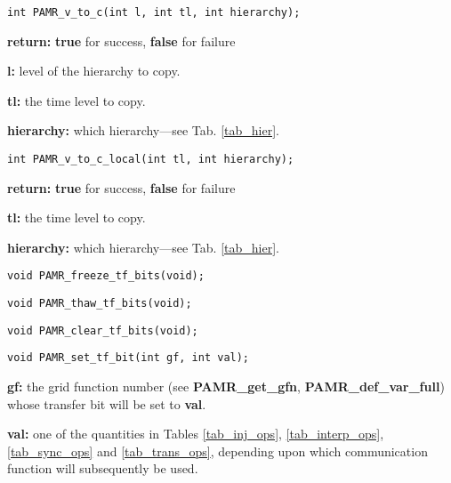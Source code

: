 \documentclass[aps,amssymb,unsortedaddress,nofootinbib]{revtex4}
\def\lsep{\itemsep 0.05in}
\begin{document}
\begin{verbatim}
int PAMR_v_to_c(int l, int tl, int hierarchy);
\end{verbatim}
\begin{list}{}{\lsep}
\item {\bf return:} {\bf true} for success, {\bf false} for failure
\item {\bf l:} level of the hierarchy to copy.
\item {\bf tl:} the time level to copy.
\item {\bf hierarchy:} which hierarchy---see Tab. \ref{tab_hier}.
\end{list}


\begin{verbatim}
int PAMR_v_to_c_local(int tl, int hierarchy);
\end{verbatim}
\begin{list}{}{\lsep}
\item {\bf return:} {\bf true} for success, {\bf false} for failure
\item {\bf tl:} the time level to copy.
\item {\bf hierarchy:} which hierarchy---see Tab. \ref{tab_hier}.
\end{list}


\begin{verbatim}
void PAMR_freeze_tf_bits(void);
\end{verbatim}


\begin{verbatim}
void PAMR_thaw_tf_bits(void);
\end{verbatim}


\begin{verbatim}
void PAMR_clear_tf_bits(void);
\end{verbatim}


\begin{verbatim}
void PAMR_set_tf_bit(int gf, int val);
\end{verbatim}
\begin{list}{}{\lsep}
\item {\bf gf:} the grid function number (see {\bf PAMR\_get\_gfn}, {\bf PAMR\_def\_var\_full}) 
                whose transfer bit will be set to {\bf val}.
\item {\bf val:} one of the quantities in Tables \ref{tab_inj_ops}, \ref{tab_interp_ops}, 
                 \ref{tab_sync_ops} and \ref{tab_trans_ops}, depending upon which communication
                 function will subsequently be used.
\end{list}
\end{document}

